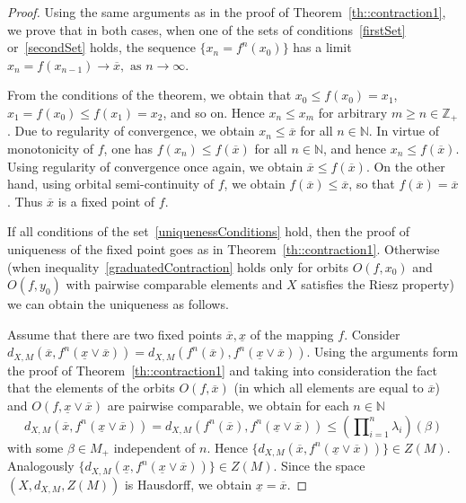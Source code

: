 \documentclass[12pt]{amsart}          %
\newcommand{\NN}{\mathbb N}
\newcommand{\ZZ}{\mathbb Z}
\begin{document}
\begin{proof}

Using the same arguments as in the proof of Theorem~\ref{th::contraction1}, we prove that in both cases, when one of the sets of conditions~\eqref{firstSet} or~\eqref{secondSet} holds, the sequence $\{ x_n = f^n(x_0)\}$ has a limit
$
x_n=f(x_{n-1})\to \overline{x},\text{ as } n\to \infty.    
$

From the conditions of the theorem, we obtain that $x_0 \leq f(x_0) = x_1$, $x_1 = f(x_0)\leq f(x_1) = x_2$, and so on. Hence $x_n\leq x_m$ for arbitrary $m\ge n\in \ZZ_+$. Due to regularity of convergence, we obtain $x_n\le \overline{x}$ for all $n\in \NN$. In virtue of monotonicity of  $f$, one has $f(x_n)\le f(\overline{x})$ for all $n\in \NN$, and hence $x_n\le f(\overline{x})$. Using regularity of convergence once again, we obtain  $\overline{x}\le f(\overline{x})$. On the other hand, using orbital semi-continuity of $f$, we obtain $f(\overline{x})\le \overline{x}$, so that $f(\overline{x})=\overline{x}$. Thus  $\overline{x}$ is a fixed point of $f$. 

If all conditions of the set~\eqref{uniquenessConditions} hold, then the proof of uniqueness of the fixed point goes as in Theorem~\ref{th::contraction1}. Otherwise (when inequality~\eqref{graduatedContraction} holds only for orbits $O(f,x_0)$ and $O(f,y_0)$ with pairwise comparable elements and $X$ satisfies the Riesz   property)  we can obtain the uniqueness as follows.

 Assume that there are two fixed points $\overline{x},\underline{x}$ of the mapping $f$. Consider 
$d_{X,M}(\overline{x}, f^n(\underline{x}\vee \overline{x}))=d_{X,M}(f^n(\overline{x}), f^n(\underline{x}\vee \overline{x}))$. Using the arguments form the proof of Theorem~\ref{th::contraction1} and taking into consideration the fact that the elements of the orbits $O(f,\overline{x})$ (in which all elements are equal to $\overline{x}$) and $O(f,\underline{x}\vee\overline{x})$ are pairwise comparable, we obtain {for each $n\in\NN$}
$$
d_{X,M}(\overline{x}, f^n(\underline{x}\vee \overline{x}))=d_{X,M}(f^n(\overline{x}),f^n(\underline{x}\vee \overline{x}))
\le  \left(\prod\nolimits_{i=1}^n\lambda_i\right)(\beta)
$$
with some $\beta\in M_+$ {independent of $n$}. Hence $\{ d_{X,M}(\overline{x}, f^n(\underline{x}\vee \overline{x}))\}\in Z(M)$. Analogously $\{ d_{X,M}(\underline{x}, f^n(\underline{x}\vee \overline{x}))\}\in Z(M)$.  Since the space $(X,d_{X,M},Z(M))$ is Hausdorff, we obtain $\underline{x}=  \overline{x}$.
\end{proof}
\end{document}
